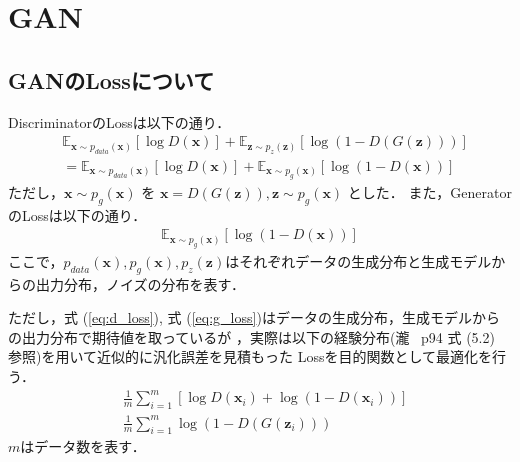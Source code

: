 \documentclass[uplatex]{jsarticle}
\begin{document}
    \section{GAN}
    \subsection{GANのLossについて}
    DiscriminatorのLossは以下の通り．
    \begin{align}
        &\mathbb{E}_{\bm{x}\sim p_{data}(\bm{x})}\left[\log D(\bm{x})\right] + \mathbb{E}_{\bm{z} \sim {p_{z}(\bm{z})}}\left[\log{\left(1-D\left(G \left(\bm{z}\right) \right) \right)}\right]  \nonumber \\ 
        &=\mathbb{E}_{\bm{x}\sim p_{data}(\bm{x})}\left[\log D(\bm{x})\right] + \mathbb{E}_{\bm{x} \sim {p_{g}(\bm{x})}}\left[\log{\left(1-D(\bm{x}) \right)}\right] \label{eq:d_loss}
    \end{align}
    ただし，$\bm{x} \sim p_{g}(\bm{x})$ を $\bm{x} = D\left( G(\bm{z})\right), \bm{z} \sim p_{g}(\bm{x})$ とした．
    また，GeneratorのLossは以下の通り．
    \begin{align}
        \mathbb{E}_{\bm{x} \sim {p_{g}(\bm{x})}}\left[\log{\left(1-D(\bm{x}) \right)}\right] 
    \label{eq:g_loss}
    \end{align}
    ここで，$p_{data}(\bm{x}), p_{g}(\bm{x}), p_{z}(\bm{z}) $はそれぞれデータの生成分布と生成モデルからの出力分布，ノイズの分布を表す．

    ただし，式 (\ref{eq:d_loss}), 式 (\ref{eq:g_loss})はデータの生成分布，生成モデルからの出力分布で期待値を取っているが
    ，実際は以下の経験分布(瀧~\cite{瀧} p94 式 (5.2) ~ 参照)を用いて近似的に汎化誤差を見積もった Lossを目的関数として最適化を行う．
    \begin{align}
        &\frac{1}{m} \sum_{i=1}^{m} \left[ \log D(\bm{x}_i)  +  \log{\left(1-D(\bm{x}_i) \right)} \right] \\
        &\frac{1}{m} \sum_{i=1}^{m} \log \left( 1 - D \left( G(\bm{z}_i) \right) \right)
    \end{align}
    $m$はデータ数を表す．
\end{document}
